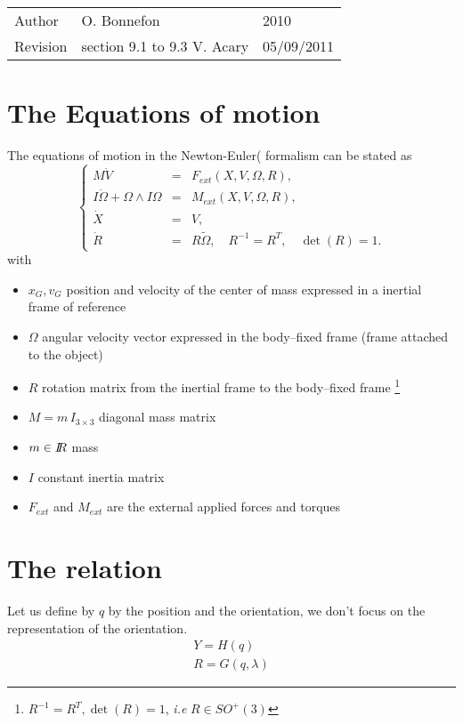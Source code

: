 


\begin{tabular}{lll}
  \centering
  Author &  O. Bonnefon &2010\\
  Revision& section 9.1 to 9.3 V. Acary&  05/09/2011
\end{tabular}
\section{The Equations of motion}

The equations of motion in the Newton-Euler(\cite{Wittenburg1977,Haug89} formalism can be stated as
\begin{equation}
  \label{eq:NewtonEuler}
  \left\{\begin{array}{rcl}
    M \dot V &=& F_{ext}(X, V, \Omega, R), \\
    I \dot \Omega + \Omega \wedge I\Omega &=&  M_{ext}(X,V, \Omega, R), \\
    \dot X &=& V, \\
    \dot R &=& R \tilde \Omega,\quad R^{-1}=R^T,\quad  \det(R)=1 .
\end{array}\right.
\end{equation}
with
\begin{itemize}
\item $x_G,v_G$ position and velocity of the center of mass expressed in a inertial frame of reference
\item $\Omega$ angular velocity vector expressed in the body--fixed frame (frame attached to the object)
\item $R$ rotation matrix from the inertial frame to the body--fixed frame \footnote{$R^{-1}=R^T, \det(R)=1$, \textit{i.e} $ R\in SO^+(3)$}
\item $M=m\,I_{3\times 3}$ diagonal mass matrix
\item $m \in \mbox{\rm $I\!\!R$}$ mass
\item $I$ constant inertia matrix
\item $F_{ext}$ and $ M_{ext}$ are the external applied forces and torques
\end{itemize}


\section{The relation}

Let us define by $q$ by  the position and the orientation, we don't focus on the  representation of the orientation.
\begin{equation}
\label{Relation}
\begin{array}{l}
Y=H(q)  \\
R=G(q,\lambda)
\end{array}
\end{equation}


